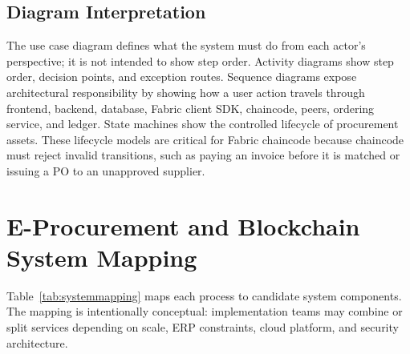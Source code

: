 \documentclass[conference]{IEEEtran}
\begin{document}
\subsection{Diagram Interpretation}
The use case diagram defines what the system must do from each actor's perspective; it is not intended to show step order. Activity diagrams show step order, decision points, and exception routes. Sequence diagrams expose architectural responsibility by showing how a user action travels through frontend, backend, database, Fabric client SDK, chaincode, peers, ordering service, and ledger. State machines show the controlled lifecycle of procurement assets. These lifecycle models are critical for Fabric chaincode because chaincode must reject invalid transitions, such as paying an invoice before it is matched or issuing a PO to an unapproved supplier.

\section{E-Procurement and Blockchain System Mapping}
Table~\ref{tab:systemmapping} maps each process to candidate system components. The mapping is intentionally conceptual: implementation teams may combine or split services depending on scale, ERP constraints, cloud platform, and security architecture.
\end{document}
